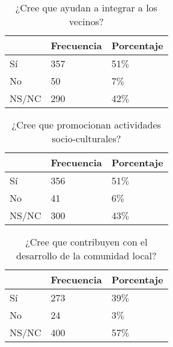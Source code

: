 \begin{table}[ht]
	\centering
{}
		\begin{tabular}{|l|l|l|}\hline
	\textbf{}&\textbf{Frecuencia}&\textbf{Porcentaje}\\\hline\hline
			Sí	&	357&	51$\%$\\\hline
			No	&	50&	7$\%$\\\hline
			NS/NC	&	290&	42$\%$\\\hline
		\end{tabular}
	  \caption{¿Cree que ayudan a integrar a los vecinos?}
	  \label{IntegraVecinosTabla}
\end{table}


\begin{table}[ht]
	\centering
{}
		\begin{tabular}{|l|l|l|}\hline
	\textbf{}&\textbf{Frecuencia}&\textbf{Porcentaje}\\\hline\hline
			Sí	&	356&	51$\%$\\\hline
			No	&	41&	6$\%$\\\hline
			NS/NC	&	300&	43$\%$\\\hline
		\end{tabular}
	  \caption{¿Cree que promocionan actividades socio-culturales?}
	  \label{ActSocioCultTabla}
\end{table}

\begin{table}[ht]
	\centering
{}
		\begin{tabular}{|l|l|l|}\hline
	\textbf{}&\textbf{Frecuencia}&\textbf{Porcentaje}\\\hline\hline
			Sí	&	273&	39$\%$\\\hline
			No	&	24&	3$\%$\\\hline
			NS/NC	&	400&	57$\%$\\\hline
		\end{tabular}
	  \caption{¿Cree que contribuyen con el desarrollo de la comunidad local?}
	  \label{DesarrolloComunidadLocalTabla}
\end{table}

